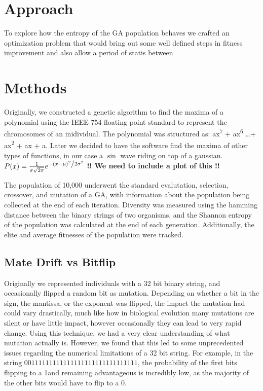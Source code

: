\documentclass[11pt]{article}
\begin{document}
\section{Approach}
\label{sec:org8c588e5}

To explore how the entropy of the GA population behaves we crafted an
optimization problem that would bring out some well defined
steps in fitness improvement and also allow a period of statis between 





\section{Methods}
\label{sec:org2c55902}
Originally, we constructed a genetic algorithm to find the maxima of a
polynomial using the IEEE 754 floating point standard to represent the
chromosomes of an inidividual. The polynomial was structured as: ax\textsuperscript{7}
+ ax\textsuperscript{6} \ldots + ax\textsuperscript{2} + ax + a. Later we
decided to have the software find the maxima of other types of functions,
in our case a $\sin$ wave riding on top of a gaussian. $ P(x) = \frac{1}{{\sigma \sqrt {2\pi } }} e^{{{ - \left( {x - \mu} \right)^2 } \mathord{\left/ {\vphantom {{ - \left( {x - \mu } \right)^2 } {2\sigma ^2 }}} \right. \kern-\nulldelimiterspace} {2\sigma ^2 }}} $
\color{red} \textbf{!! We need to include a plot of this !!}
\color{black}

The population of 10,000 underwent the standard evalutation, selection,
crossover, and mutation of a  GA, with information about the population
being collected at the end of each iteration. Diversity was measured using
the hamming distance between the binary strings of two organisms, and the
Shannon entropy of the population was calculated at the end of each generation.
Additionally, the elite and average fitnesses of the population were tracked.

\subsection{Mate Drift vs Bitflip}
Originally we represented individuals with a 32 bit binary string, and occasionally 
flipped a random bit as mutation. Depending on whether a bit in the sign, the mantissa, 
or the exponent was flipped, the impact the mutation had could vary drastically,
much like how in biological evolution many mutations are silent or have little impact,
 however occasionally  they can lead to very rapid change. Using this technique,
 we had a very clear understanding of what mutation actually is. However, we found 
that this led to some unprecedented issues regarding the numerical limitations
of a 32 bit string. For example, in the string $0 01111111 11111111111111111111111$,
the probability of the first bits flipping to a 1and remaining advantageous is incredibly
low, as the majority of the other bits would have to flip to a 0.
\end{document}
